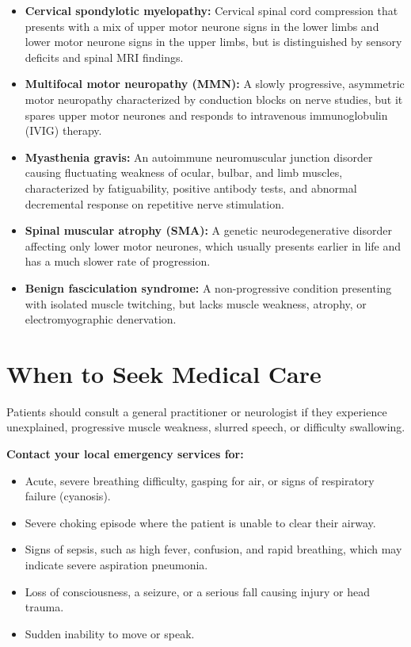 \begin{itemize}
    \item \textbf{Cervical spondylotic myelopathy:} Cervical spinal cord compression that presents with a mix of upper motor neurone signs in the lower limbs and lower motor neurone signs in the upper limbs, but is distinguished by sensory deficits and spinal MRI findings.
    \item \textbf{Multifocal motor neuropathy (MMN):} A slowly progressive, asymmetric motor neuropathy characterized by conduction blocks on nerve studies, but it spares upper motor neurones and responds to intravenous immunoglobulin (IVIG) therapy.
    \item \textbf{Myasthenia gravis:} An autoimmune neuromuscular junction disorder causing fluctuating weakness of ocular, bulbar, and limb muscles, characterized by fatiguability, positive antibody tests, and abnormal decremental response on repetitive nerve stimulation.
    \item \textbf{Spinal muscular atrophy (SMA):} A genetic neurodegenerative disorder affecting only lower motor neurones, which usually presents earlier in life and has a much slower rate of progression.
    \item \textbf{Benign fasciculation syndrome:} A non-progressive condition presenting with isolated muscle twitching, but lacks muscle weakness, atrophy, or electromyographic denervation.
\end{itemize}

\section*{When to Seek Medical Care}
Patients should consult a general practitioner or neurologist if they experience unexplained, progressive muscle weakness, slurred speech, or difficulty swallowing.

\textbf{Contact your local emergency services for:}
\begin{itemize}
    \item Acute, severe breathing difficulty, gasping for air, or signs of respiratory failure (cyanosis).
    \item Severe choking episode where the patient is unable to clear their airway.
    \item Signs of sepsis, such as high fever, confusion, and rapid breathing, which may indicate severe aspiration pneumonia.
    \item Loss of consciousness, a seizure, or a serious fall causing injury or head trauma.
    \item Sudden inability to move or speak.
\end{itemize}

